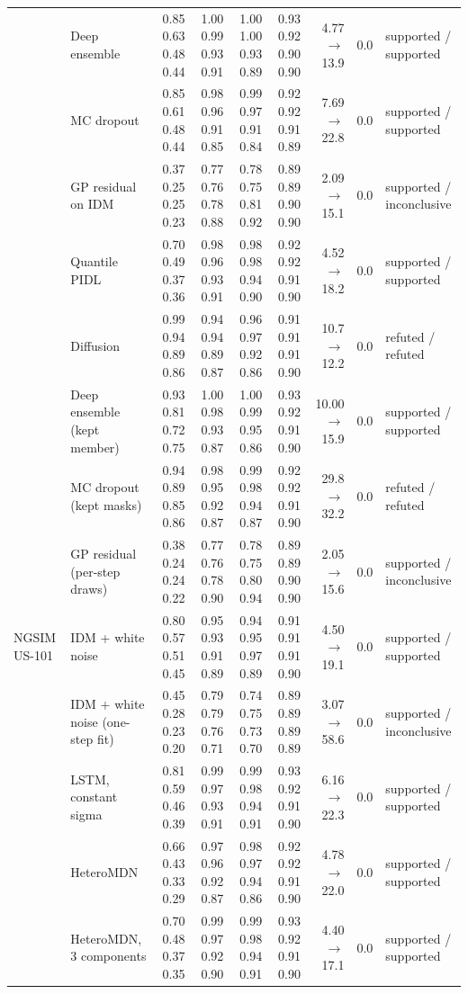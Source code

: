 \begin{longtable}{llrrrrrrl}
 & Deep ensemble & 0.85 0.63 0.48 0.44 & 1.00 0.99 0.93 0.91 & 1.00 1.00 0.93 0.89 & 0.93 0.92 0.90 0.90 & 4.77 $\rightarrow$ 13.9 & 0.0 & supported / supported \\
 & MC dropout & 0.85 0.61 0.48 0.44 & 0.98 0.96 0.91 0.85 & 0.99 0.97 0.91 0.84 & 0.92 0.92 0.91 0.89 & 7.69 $\rightarrow$ 22.8 & 0.0 & supported / supported \\
 & GP residual on IDM & 0.37 0.25 0.25 0.23 & 0.77 0.76 0.78 0.88 & 0.78 0.75 0.81 0.92 & 0.89 0.89 0.90 0.90 & 2.09 $\rightarrow$ 15.1 & 0.0 & supported / inconclusive \\
 & Quantile PIDL & 0.70 0.49 0.37 0.36 & 0.98 0.96 0.93 0.91 & 0.98 0.98 0.94 0.90 & 0.92 0.92 0.91 0.90 & 4.52 $\rightarrow$ 18.2 & 0.0 & supported / supported \\
 & Diffusion & 0.99 0.94 0.89 0.86 & 0.94 0.94 0.89 0.87 & 0.96 0.97 0.92 0.86 & 0.91 0.91 0.91 0.90 & 10.7 $\rightarrow$ 12.2 & 0.0 & refuted / refuted \\
 & Deep ensemble (kept member) & 0.93 0.81 0.72 0.75 & 1.00 0.98 0.93 0.87 & 1.00 0.99 0.95 0.86 & 0.93 0.92 0.91 0.90 & 10.00 $\rightarrow$ 15.9 & 0.0 & supported / supported \\
 & MC dropout (kept masks) & 0.94 0.89 0.85 0.86 & 0.98 0.95 0.92 0.87 & 0.99 0.98 0.94 0.87 & 0.92 0.92 0.91 0.90 & 29.8 $\rightarrow$ 32.2 & 0.0 & refuted / refuted \\
 & GP residual (per-step draws) & 0.38 0.24 0.24 0.22 & 0.77 0.76 0.78 0.90 & 0.78 0.75 0.80 0.94 & 0.89 0.89 0.90 0.90 & 2.05 $\rightarrow$ 15.6 & 0.0 & supported / inconclusive \\
\midrule
NGSIM US-101 & IDM + white noise & 0.80 0.57 0.51 0.45 & 0.95 0.93 0.91 0.89 & 0.94 0.95 0.97 0.89 & 0.91 0.91 0.91 0.90 & 4.50 $\rightarrow$ 19.1 & 0.0 & supported / supported \\
 & IDM + white noise (one-step fit) & 0.45 0.28 0.23 0.20 & 0.79 0.79 0.76 0.71 & 0.74 0.75 0.73 0.70 & 0.89 0.89 0.89 0.89 & 3.07 $\rightarrow$ 58.6 & 0.0 & supported / inconclusive \\
 & LSTM, constant sigma & 0.81 0.59 0.46 0.39 & 0.99 0.97 0.93 0.91 & 0.99 0.98 0.94 0.91 & 0.93 0.92 0.91 0.90 & 6.16 $\rightarrow$ 22.3 & 0.0 & supported / supported \\
 & HeteroMDN & 0.66 0.43 0.33 0.29 & 0.97 0.96 0.92 0.87 & 0.98 0.97 0.94 0.86 & 0.92 0.92 0.91 0.90 & 4.78 $\rightarrow$ 22.0 & 0.0 & supported / supported \\
 & HeteroMDN, 3 components & 0.70 0.48 0.37 0.35 & 0.99 0.97 0.92 0.90 & 0.99 0.98 0.94 0.91 & 0.93 0.92 0.91 0.90 & 4.40 $\rightarrow$ 17.1 & 0.0 & supported / supported \\

\end{longtable}
